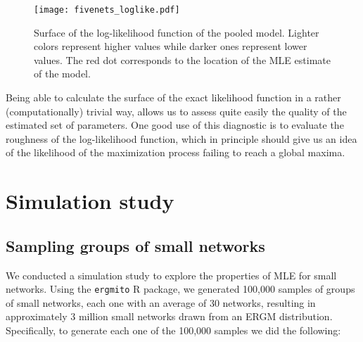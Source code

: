 \documentclass[12pt]{article}
\begin{document}
\begin{figure}[tb]
    \centering
    \caption{Surface of the log-likelihood function of the pooled \ergmito{} model. Lighter colors represent higher values while darker ones represent lower values. The red dot corresponds to the location of the MLE estimate of the model.}
    \texttt{[image: fivenets\_loglike.pdf]}
    \label{fig:fivenets-loglike}
\end{figure}

Being able to calculate the surface of the exact likelihood function in a rather (computationally) trivial way, allows us to assess quite easily the quality of the estimated set of parameters. One good use of this diagnostic is to evaluate the roughness of the log-likelihood function, which in principle should give us an idea of the likelihood of the maximization process failing to reach a global maxima.

\pagebreak
\section{Simulation study}

\subsection{Sampling groups of small networks}

We conducted a simulation study to explore the properties of MLE for small networks. Using the \texttt{ergmito} R package, we generated 100,000 samples of groups of small networks, each one with an average of 30 networks, resulting in approximately 3 million small networks drawn from an ERGM distribution. Specifically, to generate each one of the 100,000 samples we did the following:
\end{document}
